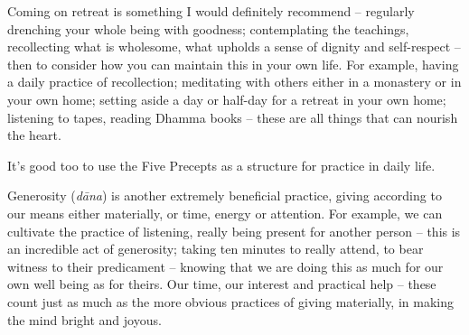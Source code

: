 Coming on retreat is something I would definitely recommend -- regularly drenching your whole being with goodness; contemplating the teachings, recollecting what is wholesome, what upholds a sense of dignity and self-respect -- then to consider how you can maintain this in your own life. For example, having a daily practice of recollection; meditating with others either in a monastery or in your own home; setting aside a day or half-day for a retreat in your own home; listening to tapes, reading Dhamma books -- these are all things that can nourish the heart.

It's good too to use the Five Precepts as a structure for practice in daily life. 

Generosity (\textit{d\=ana}) is another extremely beneficial practice, giving according to our means either materially, or time, energy or attention. For example, we can cultivate the practice of listening, really being present for another person -- this is an incredible act of generosity; taking ten minutes to really attend, to bear witness to their predicament -- knowing that we are doing this as much for our own well being as for theirs. Our time, our interest and practical help -- these count just as much as the more obvious practices of giving materially, in making the mind bright and joyous.
